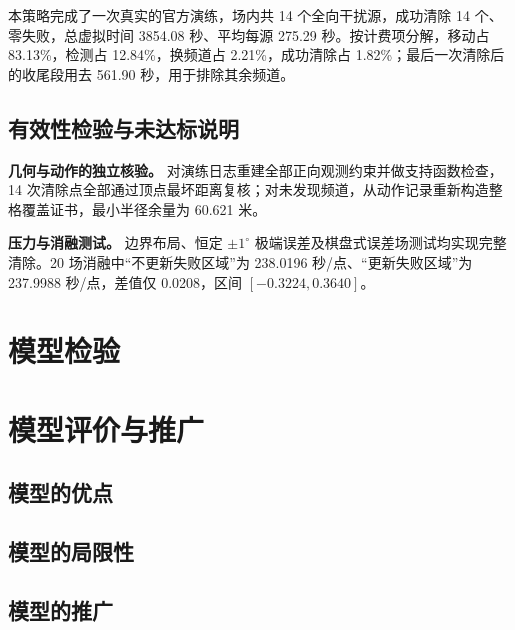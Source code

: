 \documentclass[UTF8,a4paper,zihao=-4,fontset=none]{ctexart}
\begin{document}
本策略完成了一次真实的官方演练，场内共 14 个全向干扰源，成功清除 14 个、零失败，总虚拟时间 3854.08 秒、平均每源 275.29 秒。按计费项分解，移动占 83.13\%，检测占 12.84\%，换频道占 2.21\%，成功清除占 1.82\%；最后一次清除后的收尾段用去 561.90 秒，用于排除其余频道。

\subsection{有效性检验与未达标说明}

\textbf{几何与动作的独立核验。} 对演练日志重建全部正向观测约束并做支持函数检查，14 次清除点全部通过顶点最坏距离复核；对未发现频道，从动作记录重新构造整格覆盖证书，最小半径余量为 60.621 米。

\textbf{压力与消融测试。} 边界布局、恒定 \(\pm1^\circ\) 极端误差及棋盘式误差场测试均实现完整清除。20 场消融中“不更新失败区域”为 238.0196 秒/点、“更新失败区域”为 237.9988 秒/点，差值仅 0.0208，区间 \([-0.3224,0.3640]\)。

\section{模型检验}


\section{模型评价与推广}

\subsection{模型的优点}


\subsection{模型的局限性}


\subsection{模型的推广}

\end{document}

